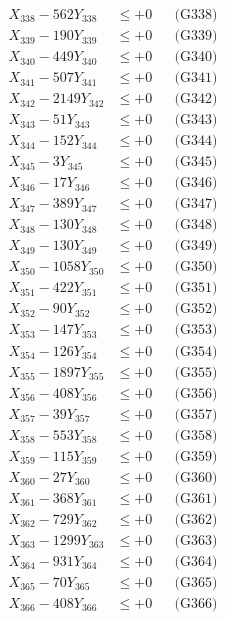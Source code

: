 \documentclass[a4paper,10pt]{article}
\begin{document}
{\begin{align}
X_{338} - 562Y_{338} &\leq +0 && \text{(G338)} \\
X_{339} - 190Y_{339} &\leq +0 && \text{(G339)} \\
X_{340} - 449Y_{340} &\leq +0 && \text{(G340)} \\
\allowbreak
X_{341} - 507Y_{341} &\leq +0 && \text{(G341)} \\
X_{342} - 2149Y_{342} &\leq +0 && \text{(G342)} \\
X_{343} - 51Y_{343} &\leq +0 && \text{(G343)} \\
X_{344} - 152Y_{344} &\leq +0 && \text{(G344)} \\
X_{345} - 3Y_{345} &\leq +0 && \text{(G345)} \\
X_{346} - 17Y_{346} &\leq +0 && \text{(G346)} \\
X_{347} - 389Y_{347} &\leq +0 && \text{(G347)} \\
X_{348} - 130Y_{348} &\leq +0 && \text{(G348)} \\
X_{349} - 130Y_{349} &\leq +0 && \text{(G349)} \\
X_{350} - 1058Y_{350} &\leq +0 && \text{(G350)} \\
\allowbreak
X_{351} - 422Y_{351} &\leq +0 && \text{(G351)} \\
X_{352} - 90Y_{352} &\leq +0 && \text{(G352)} \\
X_{353} - 147Y_{353} &\leq +0 && \text{(G353)} \\
X_{354} - 126Y_{354} &\leq +0 && \text{(G354)} \\
X_{355} - 1897Y_{355} &\leq +0 && \text{(G355)} \\
X_{356} - 408Y_{356} &\leq +0 && \text{(G356)} \\
X_{357} - 39Y_{357} &\leq +0 && \text{(G357)} \\
X_{358} - 553Y_{358} &\leq +0 && \text{(G358)} \\
X_{359} - 115Y_{359} &\leq +0 && \text{(G359)} \\
X_{360} - 27Y_{360} &\leq +0 && \text{(G360)} \\
\allowbreak
X_{361} - 368Y_{361} &\leq +0 && \text{(G361)} \\
X_{362} - 729Y_{362} &\leq +0 && \text{(G362)} \\
X_{363} - 1299Y_{363} &\leq +0 && \text{(G363)} \\
X_{364} - 931Y_{364} &\leq +0 && \text{(G364)} \\
X_{365} - 70Y_{365} &\leq +0 && \text{(G365)} \\
X_{366} - 408Y_{366} &\leq +0 && \text{(G366)} \\

\end{align}}
\end{document}
